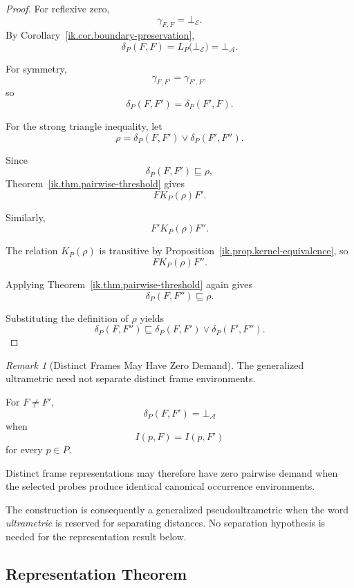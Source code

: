\documentclass[11pt]{article}
\theoremstyle{plain}
\theoremstyle{definition}
\theoremstyle{remark}
\newtheorem{remark}[theorem]{Remark}
\begin{document}
\begin{proof}
  For reflexive zero,
  \[
    \gamma_{F,F}
    =
    \bot_{\mathcal{E}}.
  \]
  By Corollary~\ref{ik.cor.boundary-preservation},
  \[
    \delta_P(F,F)
    =
    L_P
    \bigl(
    \bot_{\mathcal{E}}
    \bigr)
    =
    \bot_{\mathcal{A}}.
  \]

  For symmetry,
  \[
    \gamma_{F,F'}
    =
    \gamma_{F',F},
  \]
  so
  \[
    \delta_P(F,F')
    =
    \delta_P(F',F).
  \]

  For the strong triangle inequality,
  let
  \[
    \rho
    =
    \delta_P(F,F')
    \vee
    \delta_P(F',F'').
  \]

  Since
  \[
    \delta_P(F,F')
    \sqsubseteq
    \rho,
  \]
  Theorem~\ref{ik.thm.pairwise-threshold}
  gives
  \[
    F\mathrel{K_P(\rho)}F'.
  \]

  Similarly,
  \[
    F'\mathrel{K_P(\rho)}F''.
  \]

  The relation \(K_P(\rho)\)
  is transitive by
  Proposition~\ref{ik.prop.kernel-equivalence},
  so
  \[
    F\mathrel{K_P(\rho)}F''.
  \]

  Applying
  Theorem~\ref{ik.thm.pairwise-threshold}
  again gives
  \[
    \delta_P(F,F'')
    \sqsubseteq
    \rho.
  \]

  Substituting the definition of \(\rho\)
  yields
  \[
    \delta_P(F,F'')
    \sqsubseteq
    \delta_P(F,F')
    \vee
    \delta_P(F',F'').
  \]
\end{proof}

\begin{remark}[Distinct Frames May Have Zero Demand]
  \label{ik.rem.zero-demand}
  The generalized ultrametric need not separate
  distinct frame environments.

  For \(F\neq F'\),
  \[
    \delta_P(F,F')
    =
    \bot_{\mathcal{A}}
  \]
  when
  \[
    I(p,F)
    =
    I(p,F')
  \]
  for every \(p\in P\).

  Distinct frame representations may therefore
  have zero pairwise demand
  when the selected probes produce
  identical canonical occurrence environments.
\end{remark}

The construction is consequently
a generalized pseudoultrametric
when the word \emph{ultrametric}
is reserved for separating distances.
No separation hypothesis is needed
for the representation result below.

\subsection{Representation Theorem}
\end{document}
